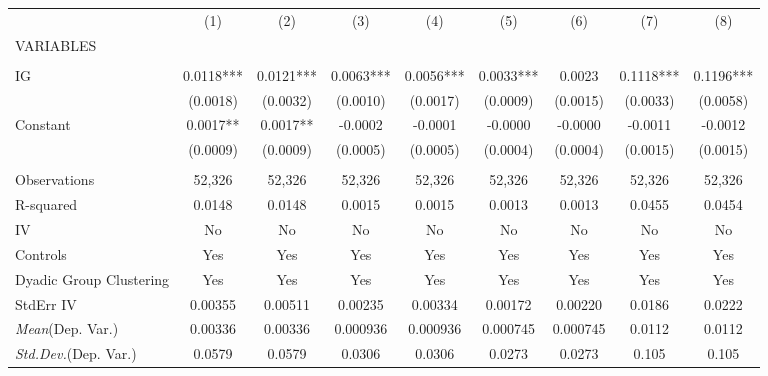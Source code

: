 \documentclass[]{article}
\begin{document}
\begin{tabular}{lcccccccc} \hline
 & (1) & (2) & (3) & (4) & (5) & (6) & (7) & (8) \\
VARIABLES &  &  &  &  &  &  &  &  \\ \hline
 &  &  &  &  &  &  &  &  \\
IG & 0.0118*** & 0.0121*** & 0.0063*** & 0.0056*** & 0.0033*** & 0.0023 & 0.1118*** & 0.1196*** \\
 & (0.0018) & (0.0032) & (0.0010) & (0.0017) & (0.0009) & (0.0015) & (0.0033) & (0.0058) \\
Constant & 0.0017** & 0.0017** & -0.0002 & -0.0001 & -0.0000 & -0.0000 & -0.0011 & -0.0012 \\
 & (0.0009) & (0.0009) & (0.0005) & (0.0005) & (0.0004) & (0.0004) & (0.0015) & (0.0015) \\
 &  &  &  &  &  &  &  &  \\
Observations & 52,326 & 52,326 & 52,326 & 52,326 & 52,326 & 52,326 & 52,326 & 52,326 \\
R-squared & 0.0148 & 0.0148 & 0.0015 & 0.0015 & 0.0013 & 0.0013 & 0.0455 & 0.0454 \\
IV & No & No & No & No & No & No & No & No \\
Controls & Yes & Yes & Yes & Yes & Yes & Yes & Yes & Yes \\
Dyadic Group Clustering & Yes & Yes & Yes & Yes & Yes & Yes & Yes & Yes \\
StdErr IV & 0.00355 & 0.00511 & 0.00235 & 0.00334 & 0.00172 & 0.00220 & 0.0186 & 0.0222 \\
\textit{Mean}(Dep. Var.) & 0.00336 & 0.00336 & 0.000936 & 0.000936 & 0.000745 & 0.000745 & 0.0112 & 0.0112 \\
 \textit{Std.Dev.}(Dep. Var.) & 0.0579 & 0.0579 & 0.0306 & 0.0306 & 0.0273 & 0.0273 & 0.105 & 0.105 \\ \hline
\end{tabular}
\end{document}
